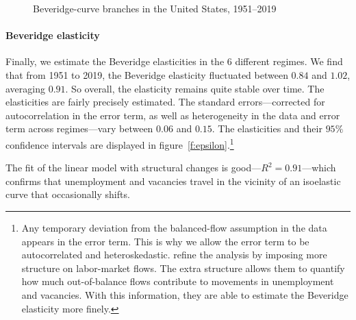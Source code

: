 \documentclass[letterpaper,12pt,leqno]{article}
\def\pdf{../../figures/xhosios_202103.pdf}
\begin{document}
\begin{figure}[p]
\hfill
{}\vfig
{}\hfill
{}\vfig
{}\hfill
{}
\caption{Beveridge-curve branches in the United States, 1951--2019}
\label{f:regimes}\end{figure}

\paragraph{Beveridge elasticity} Finally, we estimate the Beveridge elasticities in the 6 different regimes. We find that from 1951 to 2019, the Beveridge elasticity fluctuated between $0.84$ and $1.02$, averaging $0.91$. So overall, the elasticity remains quite stable over time. The elasticities are fairly precisely estimated. The standard errors---corrected for autocorrelation in the error term, as well as heterogeneity in the data and error term across regimes---vary between $0.06$ and $0.15$. The elasticities and their $95\%$ confidence intervals are displayed in figure~\ref{f:epsilon}.\footnote{Any temporary deviation from the balanced-flow assumption in the data appears in the error term. This is why we allow the error term to be autocorrelated and heteroskedastic.  refine the analysis by imposing more structure on labor-market flows. The extra structure allows them to quantify how much out-of-balance flows contribute to movements in unemployment and vacancies. With this information, they are able to estimate the Beveridge elasticity more finely.}

The fit of the linear model with structural changes is good---$R^2 = 0.91$---which confirms that unemployment and vacancies travel in the vicinity of an isoelastic curve that occasionally shifts.
\end{document}
